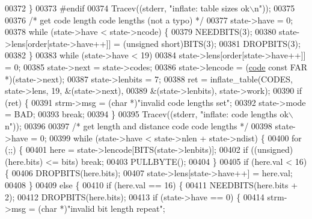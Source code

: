\begin{DoxyCode}
{{{{00372             \}
00373 \textcolor{preprocessor}{#endif}
00374             Tracev((stderr, \textcolor{stringliteral}{"inflate:       table sizes ok\(\backslash\)n"}));
00375 
00376             \textcolor{comment}{/* get code length code lengths (not a typo) */}
00377             state->have = 0;
00378             \textcolor{keywordflow}{while} (state->have < state->ncode) \{
00379                 NEEDBITS(3);
00380                 state->lens[order[state->have++]] = (\textcolor{keywordtype}{unsigned} short)BITS(3);
00381                 DROPBITS(3);
00382             \}
00383             \textcolor{keywordflow}{while} (state->have < 19)
00384                 state->lens[order[state->have++]] = 0;
00385             state->next = state->codes;
00386             state->lencode = (\hyperlink{structcode}{code} \textcolor{keyword}{const} FAR *)(state->next);
00387             state->lenbits = 7;
00388             ret = inflate\_table(CODES, state->lens, 19, &(state->next),
00389                                 &(state->lenbits), state->work);
00390             \textcolor{keywordflow}{if} (ret) \{
00391                 strm->msg = (\textcolor{keywordtype}{char} *)\textcolor{stringliteral}{"invalid code lengths set"};
00392                 state->mode = BAD;
00393                 \textcolor{keywordflow}{break};
00394             \}
00395             Tracev((stderr, \textcolor{stringliteral}{"inflate:       code lengths ok\(\backslash\)n"}));
00396 
00397             \textcolor{comment}{/* get length and distance code code lengths */}
00398             state->have = 0;
00399             \textcolor{keywordflow}{while} (state->have < state->nlen + state->ndist) \{
00400                 \textcolor{keywordflow}{for} (;;) \{
00401                     here = state->lencode[BITS(state->lenbits)];
00402                     \textcolor{keywordflow}{if} ((\textcolor{keywordtype}{unsigned})(here.bits) <= bits) \textcolor{keywordflow}{break};
00403                     PULLBYTE();
00404                 \}
00405                 \textcolor{keywordflow}{if} (here.val < 16) \{
00406                     DROPBITS(here.bits);
00407                     state->lens[state->have++] = here.val;
00408                 \}
00409                 \textcolor{keywordflow}{else} \{
00410                     \textcolor{keywordflow}{if} (here.val == 16) \{
00411                         NEEDBITS(here.bits + 2);
00412                         DROPBITS(here.bits);
00413                         \textcolor{keywordflow}{if} (state->have == 0) \{
00414                             strm->msg = (\textcolor{keywordtype}{char} *)\textcolor{stringliteral}{"invalid bit length repeat"};
}}}}
\end{DoxyCode}
